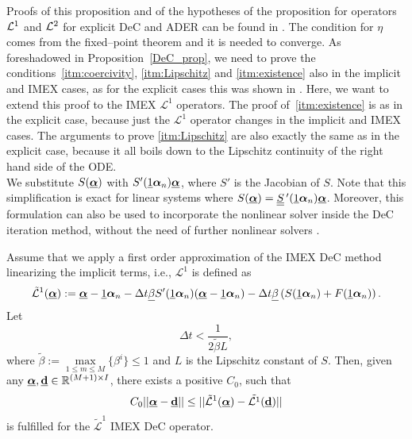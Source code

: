 Proofs of this proposition and of the hypotheses of the proposition for operators $\mathcal L^1$ and $\mathcal L^2$ for explicit DeC and ADER can be found in \cite{abgrall2017dec,abgrall2018asymptotic,offner2019arbitrary}.
The condition for $\eta$ comes from the fixed--point theorem and it is needed to converge.
As foreshadowed in Proposition~\ref{DeC_prop}, we need to prove the conditions~\ref{itm:coercivity}, \ref{itm:Lipschitz} and \ref{itm:existence} also in the implicit and IMEX cases, as for the explicit cases this was shown in \cite{Han_Veiga_2021}.
Here, we want to extend this proof to the IMEX $\mathcal{L}^1$ operators. 
The proof of~\ref{itm:existence} is as in the explicit case, because just the $\mathcal{L}^1$ operator changes in the implicit and IMEX cases. 
The arguments to prove \ref{itm:Lipschitz} are also exactly the same as in the explicit case, because it all boils down to the Lipschitz continuity of the right hand side of the ODE. \\
We substitute $S(\underline{\boldsymbol{\alpha}})$ with $S'(\underline{1}\boldsymbol{\alpha}_n)\underline{\boldsymbol{\alpha}}$, where $S'$ is the Jacobian of $S$. Note that this simplification is exact for linear systems where $S(\bbc)=\mat{S}'(\vec{1}\bc_n)\bbc$. 
Moreover, this formulation can also be used to incorporate the nonlinear solver inside the DeC iteration method, without the need of further nonlinear solvers \cite{Han_Veiga_2021}.
\begin{prop}\label{prop: ImDeC_Coercivity}
	Assume that we apply a first order approximation of the IMEX DeC method linearizing the implicit terms, i.e., $\mathcal{L}^1$ is defined as
	\begin{equation}
	\label{eq: L1_linearized_DeC}
	\tilde{\mathcal{L}}^1(\underline{\boldsymbol{\alpha}}):=\underline{\boldsymbol{\alpha}} -\underline{1}\boldsymbol{\alpha}_n-\Delta t\underline{\beta}S'(\underline{1}\boldsymbol{\alpha}_n)(\underline{\boldsymbol{\alpha}}-\underline{1}\boldsymbol{\alpha}_n)  - \Delta t\underline{\beta}\left(S(\underline{1}\boldsymbol{\alpha}_n)+F(\underline{1}\boldsymbol{\alpha}_n)\right).
	\end{equation}
	Let
	\begin{equation}\label{eq: timestep_restriction_IMDeC}
	\Delta t< \frac{1}{2\tilde{\beta} L},
	\end{equation}
	where $\tilde{\beta}:=\max\limits_{1\le m\le M}\{\beta^i\}\leq 1$ and $L$ is the Lipschitz constant of $S$.
	Then, given any $\underline{\boldsymbol{\alpha}}, \underline{\mathbf{d}} \in \mathbb{R}^{(M+1)\times I}$, there exists a positive $C_0$, such that
	\begin{equation*}
	C_0||\underline{\boldsymbol{\alpha}}-\underline{\mathbf{d}}||\leq ||\tilde{\mathcal{L}}^1 (\underline{\boldsymbol{\alpha}})-\tilde{\mathcal{L}^1} (\underline{\mathbf{d}})||
	\end{equation*}
	is fulfilled for the $\tilde{\mathcal{L}}^1$ IMEX DeC operator.
\end{prop}
